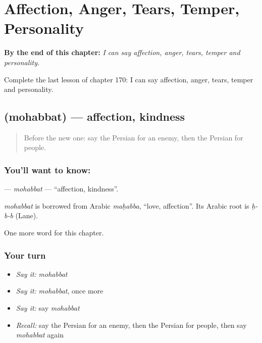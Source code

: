 
\chapter{Affection, Anger, Tears, Temper, Personality}
\label{ch:fa-affection-anger-tears-temper-personality}

\begin{chapteropening}
\textbf{By the end of this chapter:} \emph{I can say affection, anger, tears, temper and personality.}

Complete the last lesson of chapter 170: I can say affection, anger, tears, temper and personality.
\end{chapteropening}

\section[\texorpdfstring{\fa{محبت} (mohabbat)}{محبت (mohabbat)}]{ (mohabbat) — affection, kindness}

\label{lesson:FA-C170-mohabbat}



\begin{quote}
Before the new one: say the Persian for an enemy, then the Persian for people.
\end{quote}

\subsection*{You'll want to know: }
\textbf{} — \emph{mohabbat} — \textquotedblleft{}affection, kindness\textquotedblright{}.

\begin{cousinweb}
\emph{mohabbat} is borrowed from Arabic \emph{maḥabba}, \textquotedblleft{}love, affection\textquotedblright{}. Its Arabic root is \emph{ḥ-b-b} (Lane).
\end{cousinweb}

\begin{grammarlens}[title={What you've built}]
One more word for this chapter.
\end{grammarlens}

\subsection*{Your turn}
\begin{itemize}
\raggedright
  \item \emph{Say it:} \emph{mohabbat}
  \item \emph{Say it:} \emph{mohabbat}, once more
  \item \emph{Say it:} say \emph{mohabbat}
  \item \emph{Recall:} say the Persian for an enemy, then the Persian for people, then say \emph{mohabbat} again
\end{itemize}

